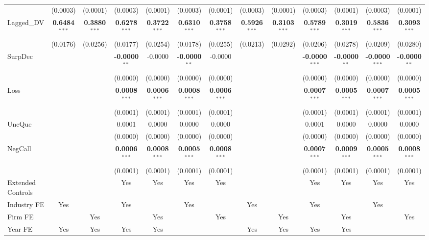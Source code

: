 \begin{landscape}
\begin{table}[H]
\begin{tabular}{lcccccccccccc}
 & (0.0003) & (0.0001) & (0.0003) & (0.0001) & (0.0003) & (0.0001) & (0.0003) & (0.0001) & (0.0003) & (0.0001) & (0.0003) & (0.0001) \\
Lagged\_DV & \textbf{0.6484}$^{***}$ & \textbf{0.3880}$^{***}$ & \textbf{0.6278}$^{***}$ & \textbf{0.3722}$^{***}$ & \textbf{0.6310}$^{***}$ & \textbf{0.3758}$^{***}$ & \textbf{0.5926}$^{***}$ & \textbf{0.3103}$^{***}$ & \textbf{0.5789}$^{***}$ & \textbf{0.3019}$^{***}$ & \textbf{0.5836}$^{***}$ & \textbf{0.3093}$^{***}$ \\
 & (0.0176) & (0.0256) & (0.0177) & (0.0254) & (0.0178) & (0.0255) & (0.0213) & (0.0292) & (0.0206) & (0.0278) & (0.0209) & (0.0280) \\
SurpDec &  &  & \textbf{-0.0000}$^{**}$ & -0.0000 & \textbf{-0.0000}$^{**}$ & -0.0000 &  &  & \textbf{-0.0000}$^{***}$ & \textbf{-0.0000}$^{**}$ & \textbf{-0.0000}$^{***}$ & \textbf{-0.0000}$^{**}$ \\
 &  &  & (0.0000) & (0.0000) & (0.0000) & (0.0000) &  &  & (0.0000) & (0.0000) & (0.0000) & (0.0000) \\
Loss &  &  & \textbf{0.0008}$^{***}$ & \textbf{0.0006}$^{***}$ & \textbf{0.0008}$^{***}$ & \textbf{0.0006}$^{***}$ &  &  & \textbf{0.0007}$^{***}$ & \textbf{0.0005}$^{***}$ & \textbf{0.0007}$^{***}$ & \textbf{0.0005}$^{***}$ \\
 &  &  & (0.0001) & (0.0001) & (0.0001) & (0.0001) &  &  & (0.0001) & (0.0001) & (0.0001) & (0.0001) \\
UncQue &  &  & 0.0001 & 0.0000 & 0.0000 & 0.0000 &  &  & 0.0001 & 0.0000 & 0.0000 & 0.0000 \\
 &  &  & (0.0000) & (0.0000) & (0.0000) & (0.0000) &  &  & (0.0000) & (0.0000) & (0.0000) & (0.0000) \\
NegCall &  &  & \textbf{0.0006}$^{***}$ & \textbf{0.0008}$^{***}$ & \textbf{0.0005}$^{***}$ & \textbf{0.0008}$^{***}$ &  &  & \textbf{0.0007}$^{***}$ & \textbf{0.0009}$^{***}$ & \textbf{0.0005}$^{***}$ & \textbf{0.0008}$^{***}$ \\
 &  &  & (0.0001) & (0.0001) & (0.0001) & (0.0001) &  &  & (0.0001) & (0.0001) & (0.0001) & (0.0001) \\
\midrule
Extended Controls &  &  & Yes & Yes & Yes & Yes &  &  & Yes & Yes & Yes & Yes \\
Industry FE & Yes &  & Yes &  & Yes &  & Yes &  & Yes &  & Yes &  \\
Firm FE &  & Yes &  & Yes &  & Yes &  & Yes &  & Yes &  & Yes \\
Year FE & Yes & Yes & Yes & Yes &  &  & Yes & Yes & Yes & Yes &  &  \\

\end{tabular}
\end{table}
\end{landscape}
